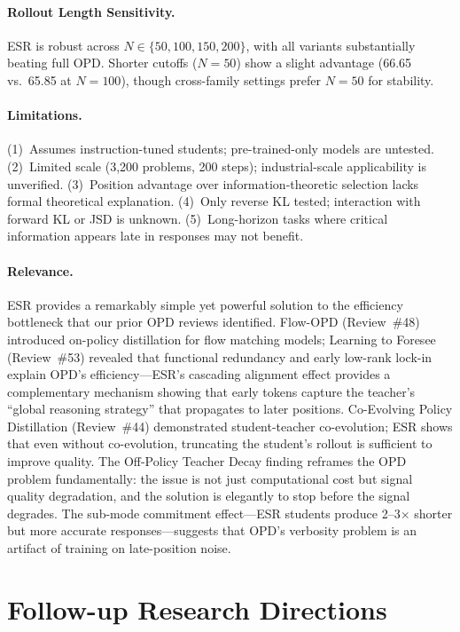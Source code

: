 \documentclass[11pt,a4paper]{article}
\begin{document}
\paragraph{Rollout Length Sensitivity.}
ESR is robust across $N \in \{50, 100, 150, 200\}$, with all variants substantially beating full OPD. Shorter cutoffs ($N=50$) show a slight advantage (66.65 vs.\ 65.85 at $N=100$), though cross-family settings prefer $N=50$ for stability.

\paragraph{Limitations.}
(1)~Assumes instruction-tuned students; pre-trained-only models are untested. (2)~Limited scale (3,200 problems, 200 steps); industrial-scale applicability is unverified. (3)~Position advantage over information-theoretic selection lacks formal theoretical explanation. (4)~Only reverse KL tested; interaction with forward KL or JSD is unknown. (5)~Long-horizon tasks where critical information appears late in responses may not benefit.

\paragraph{Relevance.}
ESR provides a remarkably simple yet powerful solution to the efficiency bottleneck that our prior OPD reviews identified. Flow-OPD (Review~\#48) introduced on-policy distillation for flow matching models; Learning to Foresee (Review~\#53) revealed that functional redundancy and early low-rank lock-in explain OPD's efficiency---ESR's cascading alignment effect provides a complementary mechanism showing that early tokens capture the teacher's ``global reasoning strategy'' that propagates to later positions. Co-Evolving Policy Distillation (Review~\#44) demonstrated student-teacher co-evolution; ESR shows that even without co-evolution, truncating the student's rollout is sufficient to improve quality. The Off-Policy Teacher Decay finding reframes the OPD problem fundamentally: the issue is not just computational cost but signal quality degradation, and the solution is elegantly to stop before the signal degrades. The sub-mode commitment effect---ESR students produce 2--3$\times$ shorter but more accurate responses---suggests that OPD's verbosity problem is an artifact of training on late-position noise.

\section*{Follow-up Research Directions}
\end{document}
